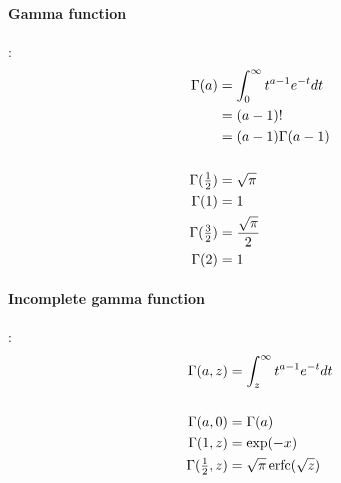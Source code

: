 

\clearpage
\label{sec:math}


\paragraph*{Gamma function}\hspace{-0.8em}\cite{Abramowitz1965}:
\begin{align*}
\Gamma(a) &= \int_0^{\infty} t^{a-1} e^{-t} dt 		 \\
& =(a-1)!									
\\ & = (a-1) \Gamma(a-1)						
\\
\\
\Gamma(\tfrac{1}{2}) &= \sqrt{\pi}				 \\
\Gamma(1) &= 1 							 \\
\Gamma(\tfrac{3}{2})&= \frac{ \sqrt{\pi} }{2}  		  \\
\Gamma(2) & =1 							
\end{align*}


\paragraph*{Incomplete gamma function}\hspace{-0.8em}\cite{Abramowitz1965}:%
 \begin{align*} 
\Gamma(a,z) &= \int_z^{\infty} t^{a-1} e^{-t} dt				
\\
\\
 \Gamma(a,0)&=\Gamma(a)  							 \\
\Gamma(1,z)&=\exp(-x) 									\\
 \Gamma(\tfrac{1}{2},z)&=\sqrt{\pi}\operatorname{erfc}(\sqrt{z}) 		
 \end{align*}
 
